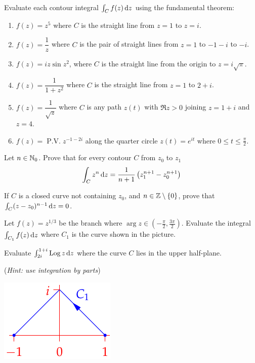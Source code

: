 \begin{exercises}
	\exstart Evaluate each contour integral $\int_Cf(z)\,{\mathrm{d} z}$ using the fundamental theorem:

	\begin{enumerate}\setcounter{enumi}{1}
	  \item[]\begin{enumerate}
	    \item $f(z)=z^5$ where $C$ is the straight line from $z=1$ to $z=i$.
	    \item $f(z)=\dfrac 1z$ where $C$ is the pair of straight lines from $z=1$ to $-1-i$ to $-i$.
	    
	    \item $f(z)=iz\sin z^2$, where $C$ is the straight line from the origin to $z=i\sqrt\pi$.
	    
	    \item $f(z)=\dfrac 1{1+z^2}$ where $C$ is the straight line from $z=1$ to $2+i$.
	    \item $f(z)=\dfrac 1{\sqrt z}$ where $C$ is any path $z(t)$ with $\Re z>0$ joining $z=1+i$ and $z=4$.
	    
	    \item $f(z)=\operatorname{P.V.}z^{-1-2i}$ along the quarter circle $z(t)=e^{it}$ where $0\le t\le\frac\pi 2$.
		\end{enumerate}
		
		
	  \item Let $n\in\mathbb{N}_0$. Prove that for every contour $C$ from $z_0$ to $z_1$
	  \[
	  	\int_C z^n\,{\mathrm{d} z}=\frac 1{n+1}\left(z_1^{n+1}-z_0^{n+1}\right)
	  \]
	
	
	  \item If $C$ is a closed curve not containing $z_0$, and $n\in\mathbb{Z}\setminus\{0\}$, prove that $\int_C (z-z_0)^{n-1}\,{\mathrm{d} z}=0$.
	  
	
		\begin{minipage}[t]{0.75\linewidth}\vspace{0pt}
			\item Let $f(z)=z^{1/3}$ be the branch where $\arg z\in(-\frac\pi 2,\frac{3\pi}2)$. Evaluate the integral $\int_{C_1}f(z)\,{\mathrm{d} z}$ where $C_1$ is the curve shown in the picture.
			
			\item Evaluate $\int_{2i}^{1+i}\operatorname{Log} z\,{\mathrm{d} z}$ where the curve $C$ lies in the upper half-plane.\par
			(\emph{Hint: use integration by parts})
		\end{minipage}
		\hfill
		\begin{minipage}[t]{0.24\linewidth}\vspace{-10pt}
			\flushright\includegraphics{ftc-3}
		\end{minipage}
		

\end{enumerate}
\end{exercises}
